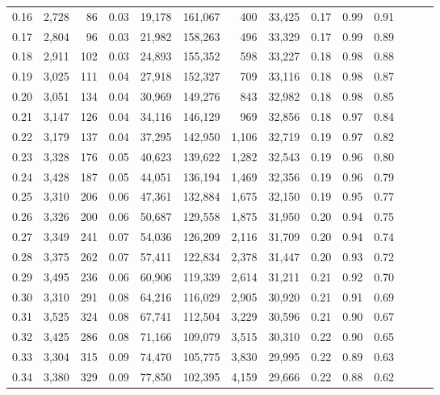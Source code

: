\begin{tabular}{rrrrrrrrrrrrrr}
0.16 &  2,728 &   86 &  0.03 &   19,178 &  161,067 &     400 &  33,425 &  0.17 &  0.99 &      0.91 \\
0.17 &  2,804 &   96 &  0.03 &   21,982 &  158,263 &     496 &  33,329 &  0.17 &  0.99 &      0.89 \\
0.18 &  2,911 &  102 &  0.03 &   24,893 &  155,352 &     598 &  33,227 &  0.18 &  0.98 &      0.88 \\
0.19 &  3,025 &  111 &  0.04 &   27,918 &  152,327 &     709 &  33,116 &  0.18 &  0.98 &      0.87 \\
0.20 &  3,051 &  134 &  0.04 &   30,969 &  149,276 &     843 &  32,982 &  0.18 &  0.98 &      0.85 \\
0.21 &  3,147 &  126 &  0.04 &   34,116 &  146,129 &     969 &  32,856 &  0.18 &  0.97 &      0.84 \\
0.22 &  3,179 &  137 &  0.04 &   37,295 &  142,950 &   1,106 &  32,719 &  0.19 &  0.97 &      0.82 \\
0.23 &  3,328 &  176 &  0.05 &   40,623 &  139,622 &   1,282 &  32,543 &  0.19 &  0.96 &      0.80 \\
0.24 &  3,428 &  187 &  0.05 &   44,051 &  136,194 &   1,469 &  32,356 &  0.19 &  0.96 &      0.79 \\
0.25 &  3,310 &  206 &  0.06 &   47,361 &  132,884 &   1,675 &  32,150 &  0.19 &  0.95 &      0.77 \\
0.26 &  3,326 &  200 &  0.06 &   50,687 &  129,558 &   1,875 &  31,950 &  0.20 &  0.94 &      0.75 \\
0.27 &  3,349 &  241 &  0.07 &   54,036 &  126,209 &   2,116 &  31,709 &  0.20 &  0.94 &      0.74 \\
0.28 &  3,375 &  262 &  0.07 &   57,411 &  122,834 &   2,378 &  31,447 &  0.20 &  0.93 &      0.72 \\
0.29 &  3,495 &  236 &  0.06 &   60,906 &  119,339 &   2,614 &  31,211 &  0.21 &  0.92 &      0.70 \\
0.30 &  3,310 &  291 &  0.08 &   64,216 &  116,029 &   2,905 &  30,920 &  0.21 &  0.91 &      0.69 \\
0.31 &  3,525 &  324 &  0.08 &   67,741 &  112,504 &   3,229 &  30,596 &  0.21 &  0.90 &      0.67 \\
0.32 &  3,425 &  286 &  0.08 &   71,166 &  109,079 &   3,515 &  30,310 &  0.22 &  0.90 &      0.65 \\
0.33 &  3,304 &  315 &  0.09 &   74,470 &  105,775 &   3,830 &  29,995 &  0.22 &  0.89 &      0.63 \\
0.34 &  3,380 &  329 &  0.09 &   77,850 &  102,395 &   4,159 &  29,666 &  0.22 &  0.88 &      0.62 \\

\end{tabular}
